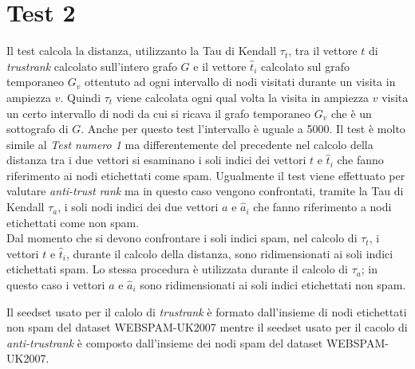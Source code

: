 \section{Test 2}
Il test  calcola la distanza, utilizzanto la Tau di Kendall \(\tau_t\), tra  il vettore \(t\) di \textit{trustrank} calcolato sull'intero grafo \(G\) e il vettore \(\hat{t}_i\) calcolato sul grafo temporaneo \(G_v\) ottentuto ad ogni intervallo di nodi visitati durante un visita in ampiezza \(v\). Quindi \(\tau_t\) viene calcolata ogni qual volta la visita in ampiezza \(v\) visita un certo intervallo di nodi da cui si ricava il grafo temporaneo \(G_v\) che è un sottografo di \(G\).  Anche per questo test l'intervallo è uguale a 5000.  Il test è molto simile al \textit{Test numero 1} ma differentemente del precedente nel calcolo della distanza tra i due vettori si esaminano i soli indici dei vettori \(t\) e \(\hat{t}_i\) che fanno riferimento ai nodi etichettati come spam. Ugualmente il test viene effettuato per valutare \textit{anti-trust rank} ma in questo caso vengono confrontati, tramite la Tau di Kendall \(\tau_a\), i soli nodi indici dei due vettori \(a\) e \(\hat{a}_i\) che fanno 
riferimento a nodi etichettati come non spam.\\
Dal momento che si devono confrontare i soli indici spam, nel calcolo di \(\tau_t\), i vettori \(t\) e \(\hat{t}_i\), durante il calcolo della distanza, sono ridimensionati ai soli indici etichettati spam. Lo stessa procedura è utilizzata  durante il calcolo di \(\tau_a\); in questo caso i vettori \(a\) e \(\hat{a}_i\) sono ridimensionati ai soli indici etichettati non spam. 

Il seedset usato per il calolo di \textit{trustrank} è formato dall'insieme di nodi etichettati non spam del dataset WEBSPAM-UK2007 mentre il seedset usato per il cacolo di \textit{anti-trustrank} è composto dall'insieme dei nodi spam del dataset WEBSPAM-UK2007.

